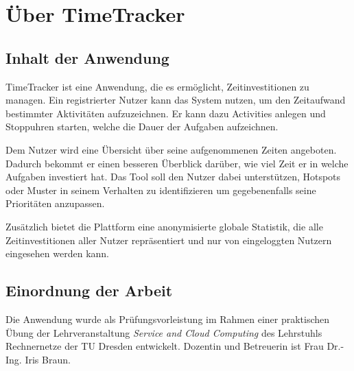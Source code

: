 \section{Über TimeTracker}

\subsection{Inhalt der Anwendung}
TimeTracker ist eine Anwendung, die es ermöglicht, Zeitinvestitionen zu managen. Ein registrierter Nutzer kann das System nutzen, um den Zeitaufwand bestimmter Aktivitäten aufzuzeichnen. Er kann dazu Activities anlegen und Stoppuhren starten, welche die Dauer der Aufgaben aufzeichnen.

Dem Nutzer wird eine Übersicht über seine aufgenommenen Zeiten angeboten. Dadurch bekommt er einen besseren Überblick darüber, wie viel Zeit er in welche Aufgaben investiert hat. Das Tool soll den Nutzer dabei unterstützen, Hotspots oder Muster in seinem Verhalten zu identifizieren um gegebenenfalls seine Prioritäten anzupassen.

Zusätzlich bietet die Plattform eine anonymisierte globale Statistik, die alle Zeitinvestitionen aller Nutzer repräsentiert und nur von eingeloggten Nutzern eingesehen werden kann.

\subsection{Einordnung der Arbeit}
Die Anwendung wurde als Prüfungsvorleistung im Rahmen einer praktischen Übung der Lehrveranstaltung \textit{Service and Cloud Computing} des Lehrstuhls Rechnernetze der TU Dresden entwickelt. Dozentin und Betreuerin ist Frau Dr.-Ing. Iris Braun. 